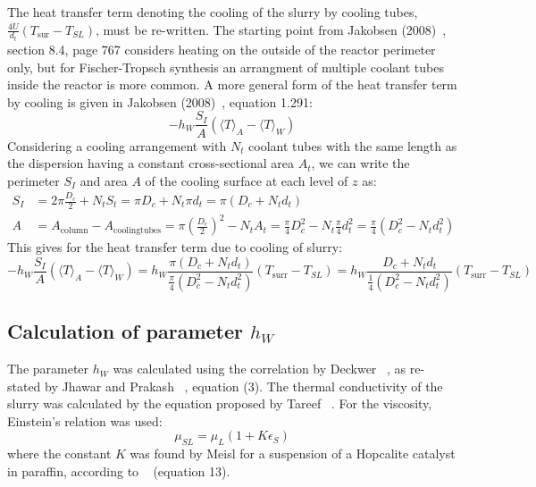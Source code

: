 \documentclass{article}
\begin{document}
The heat transfer term denoting the cooling of the slurry by cooling tubes, $\frac{4U}{d_t}(T_{\mathrm{sur}}-T_{SL})$, must be re-written. The starting point from Jakobsen (2008)~\cite{Jakobsen08}, section 8.4, page 767 considers heating on the outside of the reactor perimeter only, but for Fischer-Tropsch synthesis an arrangment of multiple coolant tubes inside the reactor is more common. A more general form of the heat transfer term by cooling is given in Jakobsen (2008)~\cite{Jakobsen08}, equation 1.291:
\begin{equation}
	-h_W\frac{S_I}{A}(\langle T\rangle_A -\langle T \rangle_W)
\end{equation}
Considering a cooling arrangement with $N_t$ coolant tubes with the same length as the dispersion having a constant cross-sectional area $A_t$, we can write the perimeter $S_I$ and area $A$ of the cooling surface at each level of $z$ as:
\begin{equation}
	\begin{split}
		S_I &= 2\pi\frac{D_c}{2} + N_tS_t = \pi D_c + N_t\pi d_t = \pi \left(D_c + N_td_t \right)\\
		A &= A_{\mathrm{column}}-A_{\mathrm{cooling tubes}} = \pi \left(\frac{D_c}{2}\right)^2 - N_tA_t = \frac{\pi}{4}D_c^2 - N_t\frac{\pi}{4}d_t^2 = \frac{\pi}{4}\left(D_c^2-N_td_t^2\right)
	\end{split}
\end{equation}
This gives for the heat transfer term due to cooling of slurry:
\begin{equation}
	-h_W\frac{S_I}{A}(\langle T\rangle_A -\langle T \rangle_W) = h_W\frac{\pi \left(D_c + N_td_t \right)}{\frac{\pi}{4}\left(D_c^2-N_td_t^2\right)}(T_{\mathrm{surr}}-T_{SL}) =h_W \frac{D_c + N_td_t}{\frac{1}{4}(D_c^2-N_td_t^2)} (T_{\mathrm{surr}}-T_{SL})
\end{equation}

\subsection{Calculation of parameter $h_W$}
The parameter $h_W$ was calculated using the correlation by Deckwer ~\cite{Deckwer1980}, as re-stated by Jhawar and Prakash ~\cite{JhawarPrakash2011}, equation (3). The thermal conductivity of the slurry was calculated by the equation proposed by Tareef ~\cite{Tareef1940}. For the viscosity, Einstein's relation was used:
\begin{equation}
	\mu_{SL} = \mu_L(1+K\epsilon_S)
\end{equation}
where the constant $K$ was found by Meisl for a suspension of a Hopcalite catalyst in paraffin, according to ~\cite{DeckwerLouisiZaidiRalek1980} (equation 13).
\end{document}
